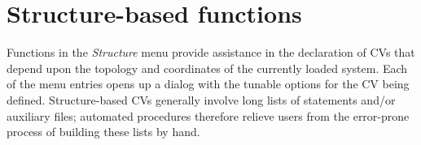 \documentclass[preprint,12pt]{elsarticle}
\begin{document}
\section{Structure-based functions}


Functions in the \emph{Structure} menu provide assistance in the
declaration of CVs that depend upon the topology and coordinates of
the currently loaded system.  Each of the menu entries opens up a
dialog with the tunable options for the CV being defined. Structure-based CVs
generally involve long lists of statements and/or auxiliary files;
automated procedures therefore relieve users from the error-prone
process of building these lists by hand.
\end{document}
